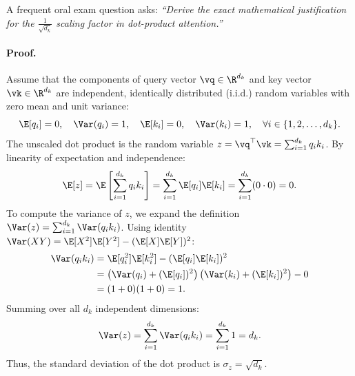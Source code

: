 \documentclass[../../main.tex]{subfiles}
\begin{document}
\begin{examinsight}
A frequent oral exam question asks: \emph{``Derive the exact mathematical justification for the $\frac{1}{\sqrt{d_k}}$ scaling factor in dot-product attention.''}

\paragraph{Proof.}
Assume that the components of query vector $\vq \in \R^{d_k}$ and key vector $\vk \in \R^{d_k}$ are independent, identically distributed (i.i.d.) random variables with zero mean and unit variance:
\begin{equation}
\E[q_i] = 0, \quad \Var(q_i) = 1, \quad \E[k_i] = 0, \quad \Var(k_i) = 1, \quad \forall i \in \{1, 2, \dots, d_k\}.
\end{equation}
The unscaled dot product is the random variable $z = \vq^\top \vk = \sum_{i=1}^{d_k} q_i k_i$.
By linearity of expectation and independence:
\begin{equation}
\E[z] = \E\left[\sum_{i=1}^{d_k} q_i k_i\right] = \sum_{i=1}^{d_k} \E[q_i]\E[k_i] = \sum_{i=1}^{d_k} (0 \cdot 0) = 0.
\end{equation}
To compute the variance of $z$, we expand the definition $\Var(z) = \sum_{i=1}^{d_k} \Var(q_i k_i)$. Using identity $\Var(X Y) = \E[X^2]\E[Y^2] - (\E[X]\E[Y])^2$:
\begin{align}
\Var(q_i k_i) &= \E[q_i^2]\E[k_i^2] - (\E[q_i]\E[k_i])^2 \nonumber \\
&= \left(\Var(q_i) + (\E[q_i])^2\right)\left(\Var(k_i) + (\E[k_i])^2\right) - 0 \nonumber \\
&= (1 + 0)(1 + 0) = 1.
\end{align}
Summing over all $d_k$ independent dimensions:
\begin{equation}
\label{eq:variance_unscaled_dot_product}
\Var(z) = \sum_{i=1}^{d_k} \Var(q_i k_i) = \sum_{i=1}^{d_k} 1 = d_k.
\end{equation}
Thus, the standard deviation of the dot product is $\sigma_z = \sqrt{d_k}$.


\end{examinsight}
\end{document}
